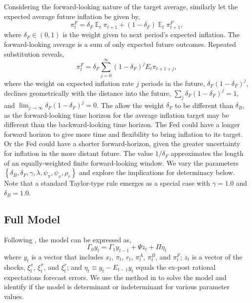 \documentclass[english,authoryear,12pt]{elsarticle}
\DeclareMathOperator{\E}{\mathbb{E}}
\begin{document}
Considering the forward-looking nature of the target average, similarly let the expected average future inflation be given by,
\begin{equation}\label{eq:forward}
	\pi_t^F = \delta_F \E_t \pi_{t+1} + (1-\delta_F) \E_t \pi_{t+1}^F,
\end{equation}
where $\delta_F \in (0,1)$ is the weight given to next period's expected inflation. The forward-looking average is a sum of only expected future outcomes. Repeated substitution reveals,
\begin{equation}\label{eq:forward_all}
	\pi_t^F = \delta_F \sum_{j=0}^{\infty} (1-\delta_F)^j E_t \pi_{t+1+j},
\end{equation}
where the weight on expected inflation rate $j$ periods in the future, $\delta_F (1-\delta_F)^{j}$, declines geometrically with the distance into the future, $\sum_j \delta_F (1-\delta_F)^{j}=1$, and $\lim_{j \to \infty} \delta_F (1-\delta_F)^j=0$. The allow the weight $\delta_F$ to be different than $\delta_B$, as the forward-looking time horizon for the average inflation target may be different than the backward-looking time horizon. The Fed could have a longer forward horizon to give more time and flexibility to bring inflation to its target. Or the Fed could have a shorter forward-horizon, given the greater uncertainty for inflation in the more distant future. The value $1/ \delta_F$ approximates the length of an equally-weighted finite forward-looking window. We vary the parameters $\left\{\delta_B, \delta_F, \gamma, \lambda, \psi_\pi, \psi_x, \rho_r \right\}$ and explore the implications for determinacy below. Note that a standard Taylor-type rule emerges as a special case with $\gamma=1.0$ and $\delta_B=1.0$.

\subsection{Full Model}

Following \citet{sims2002}, the model can be expressed as,
\begin{equation}
	\Gamma_0 y_t = \Gamma_1 y_{t-1} + \Psi z_t + \Pi \eta_t
\end{equation}
where $y_t$ is a vector that includes $x_t$, $\pi_t$, $r_t$, $\pi_t^A$, $\pi_t^B$, and $\pi_t^F$; $z_t$ is a vector of the shocks, $\xi_t^x$, $\xi_t^\pi$, and $\xi_t^r$; and $\eta_t \equiv y_t - E_{t-1} y_t$ equals the ex-post rational expectations forecast errors. We use the method in \citet{sims2002} to solve the model and identify if the model is determinant or indeterminant for various parameter values.
\end{document}

